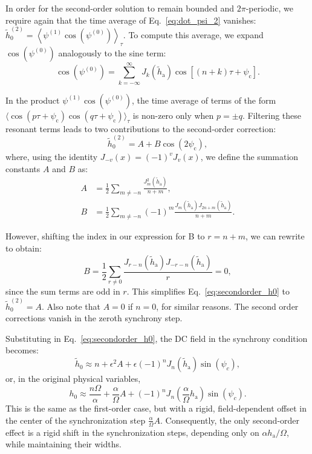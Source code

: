 \documentclass[prb,aps,twocolumn,superscriptaddress,floatfix]{revtex4-1}
\begin{document}
In order for the second-order solution to remain bounded and $2\pi$-periodic, we require again that the time average of Eq.~\eqref{eq:dot_psi_2} vanishes: $\tilde h_0^{(2)} = \left\langle \psi^{(1)} \cos\left(\psi^{(0)}\right) \right\rangle_\tau$. To compute this average, we expand $\cos\left(\psi^{(0)}\right)$ analogously to the sine term:
%
\begin{equation}
    \cos\left(\psi^{(0)}\right) = \sum_{k=-\infty}^{\infty} J_k(\tilde h_\text{a}) \cos[(n+k)\tau + \psi_\text{c}].
\end{equation}

In the product $\psi^{(1)} \cos\left(\psi^{(0)}\right)$, the time average of terms of the form $\langle \cos(p\tau+\psi_\text{c}) \cos(q\tau+\psi_\text{c}) \rangle_\tau$ is non-zero only when $p=\pm q$. Filtering these resonant terms leads to two contributions to the second-order correction:
%
\begin{equation}
    \tilde h_0^{(2)} = A + B \cos(2\psi_\text{c}),
    \label{eq:secondorder_h0}
\end{equation}
%
where, using the identity $J_{-v}(x) = (-1)^v J_v(x)$, we define the summation constants $A$ and $B$ as:
%
\begin{align}
    A &= \frac{1}{2}\sum_{m\neq -n} \frac{J_m^2(\tilde h_\text{a})}{n+m}, \\
    B &= \frac{1}{2}\sum_{m\neq -n} (-1)^m \frac{J_m(\tilde h_\text{a})J_{2n+m}(\tilde h_\text{a})}{n+m}.
\end{align}

However, shifting the index in our expression for B to $r=n+m$, we can rewrite to obtain:
%
\begin{equation}
    B=\frac{1}{2}\sum_{r\neq 0} \frac{J_{r-n}(\tilde h_\text{a})J_{-r-n}(\tilde h_\text{a})}{r}=0,
\end{equation}
%
since the sum terms are odd in $r$. This simplifies Eq.~\eqref{eq:secondorder_h0} to $\tilde{h}_0^{(2)}=A$. Also note that $A=0$ if $n=0$, for similar reasons. The second order corrections vanish in the zeroth synchrony step.

Substituting in Eq.~\eqref{eq:secondorder_h0}, the DC field in the synchrony condition becomes:
%
\begin{equation}
    \tilde h_0 \approx n + \epsilon^2A + \epsilon(-1)^n J_n(\tilde h_\text{a})\sin(\psi_c),
\end{equation}
%
or, in the original physical variables,
%
\begin{equation}
    h_0 \approx \frac{n\Omega}{\alpha} + \frac{\alpha}{\Omega}A + (-1)^n J_n(\frac{\alpha}{\Omega} h_\text{a})\sin(\psi_c).
    \label{eq:h0_2order}
\end{equation}
%
This is the same as the first-order case, but with a rigid, field-dependent offset in the center of the synchronization step $\frac{\alpha}{\Omega}A$. Consequently, the only second-order effect is a rigid shift in the synchronization steps, depending only on $\alpha h_\text {a}/\Omega$, while maintaining their widths.
\end{document}
